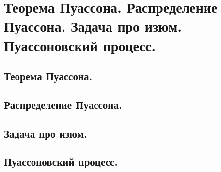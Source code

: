 \section{Теорема Пуассона. Распределение Пуассона. Задача про изюм. Пуассоновский процесс.}

\subsection{Теорема Пуассона.}

\subsection{Распределение Пуассона.}

\subsection{Задача про изюм.}

\subsection{Пуассоновский процесс.}